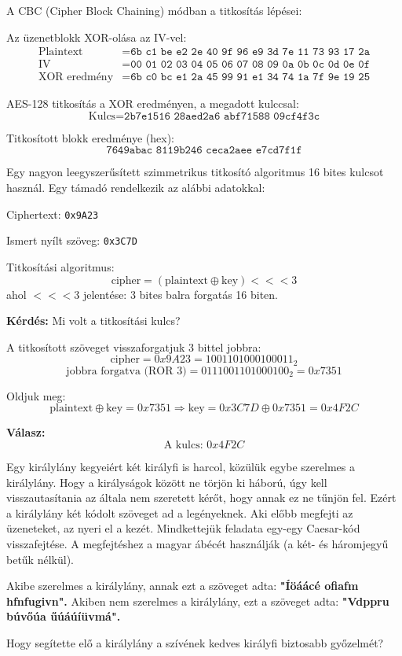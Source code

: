 \begin{solution}
A CBC (Cipher Block Chaining) módban a titkosítás lépései:

Az üzenetblokk XOR-olása az IV-vel: 
\begin{align*}
\text{Plaintext} & =\texttt{6b c1 be e2 2e 40 9f 96 e9 3d 7e 11 73 93 17 2a}\\
\text{IV} & =\texttt{00 01 02 03 04 05 06 07 08 09 0a 0b 0c 0d 0e 0f}\\
\text{XOR eredmény} & =\texttt{6b c0 bc e1 2a 45 99 91 e1 34 74 1a 7f 9e 19 25}
\end{align*}

AES-128 titkosítás a XOR eredményen, a megadott kulccsal: 
\[
\text{Kulcs}=\texttt{2b7e1516 28aed2a6 abf71588 09cf4f3c}
\]

Titkosított blokk eredménye (hex): 
\[
\boxed{\texttt{7649abac 8119b246 ceca2aee e7cd7f1f}}
\]
\end{solution}
\begin{extraproblem}
Egy nagyon leegyszerűsített szimmetrikus titkosító algoritmus 16
bites kulcsot használ. Egy támadó rendelkezik az alábbi adatokkal:

Ciphertext: \texttt{0x9A23}

Ismert nyílt szöveg: \texttt{0x3C7D}

Titkosítási algoritmus: 
\[
\text{cipher}=(\text{plaintext}\oplus\text{key})<<<3
\]
ahol $<<<3$ jelentése: 3 bites balra forgatás 16 biten.

\textbf{Kérdés:} Mi volt a titkosítási kulcs?
\end{extraproblem}

\begin{solution}
A titkosított szöveget visszaforgatjuk 3 bittel jobbra: 
\[
\text{cipher}=0x9A23=1001101000100011_{2}
\]
\[
\text{jobbra forgatva (ROR 3)}=0111001101000100_{2}=0x7351
\]

Oldjuk meg: 
\[
\text{plaintext}\oplus\text{key}=0x7351\Rightarrow\text{key}=0x3C7D\oplus0x7351=0x4F2C
\]

\textbf{Válasz:} 
\[
\boxed{\text{A kulcs: }0x4F2C}
\]
\end{solution}
\begin{extraproblem}
Egy királylány kegyeiért két királyfi is harcol, közülük egybe szerelmes
a királylány. Hogy a királyságok között ne törjön ki háború, úgy kell
visszautasítania az általa nem szeretett kérőt, hogy annak ez ne tűnjön
fel. Ezért a királylány két kódolt szöveget ad a legényeknek. Aki
előbb megfejti az üzeneteket, az nyeri el a kezét. Mindkettejük feladata
egy-egy Caesar-kód visszafejtése. A megfejtéshez a magyar ábécét használják
(a két- és háromjegyű betűk nélkül).

Akibe szerelmes a királylány, annak ezt a szöveget adta: \textbf{"Íöáácé
ofiafm hfnfugivn".} Akiben nem szerelmes a királylány, ezt a szöveget
adta: \textbf{"Vdppru búvőúa űúáúíüvmá".}

Hogy segítette elő a királylány a szívének kedves királyfi biztosabb
győzelmét? 
\end{extraproblem}

